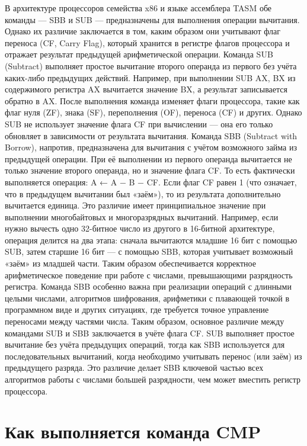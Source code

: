 В архитектуре процессоров семейства x86 и языке ассемблера TASM обе команды — SBB и SUB — предназначены для выполнения операции вычитания. Однако их различие заключается в том, каким образом они учитывают флаг переноса (CF, Carry Flag), который хранится в регистре флагов процессора и отражает результат предыдущей арифметической операции.
Команда SUB (Subtract) выполняет простое вычитание второго операнда из первого без учёта каких-либо предыдущих действий. Например, при выполнении SUB AX, BX из содержимого регистра AX вычитается значение BX, а результат записывается обратно в AX. После выполнения команда изменяет флаги процессора, такие как флаг нуля (ZF), знака (SF), переполнения (OF), переноса (CF) и других. Однако SUB не использует значение флага CF при вычислении — она его только обновляет в зависимости от результата вычитания.
Команда SBB (Subtract with Borrow), напротив, предназначена для вычитания с учётом возможного займа из предыдущей операции. При её выполнении из первого операнда вычитается не только значение второго операнда, но и значение флага CF. То есть фактически выполняется операция:
A ← A − B − CF.
Если флаг CF равен 1 (что означает, что в предыдущем вычитании был «заём»), то из результата дополнительно вычитается единица.
Это различие имеет принципиальное значение при выполнении многобайтовых и многоразрядных вычитаний. Например, если нужно вычесть одно 32-битное число из другого в 16-битной архитектуре, операция делится на два этапа: сначала вычитаются младшие 16 бит с помощью SUB, затем старшие 16 бит — с помощью SBB, которая учитывает возможный «заём» из младшей части. Таким образом обеспечивается корректное арифметическое поведение при работе с числами, превышающими разрядность регистра.
Команда SBB особенно важна при реализации операций с длинными целыми числами, алгоритмов шифрования, арифметики с плавающей точкой в программном виде и других ситуациях, где требуется точное управление переносами между частями числа.
Таким образом, основное различие между командами SUB и SBB заключается в учёте флага CF. SUB выполняет простое вычитание без учёта предыдущих операций, тогда как SBB используется для последовательных вычитаний, когда необходимо учитывать перенос (или заём) из предыдущего разряда. Это различие делает SBB ключевой частью всех алгоритмов работы с числами большей разрядности, чем может вместить регистр процессора.

\section{Как выполняется команда CMP}

